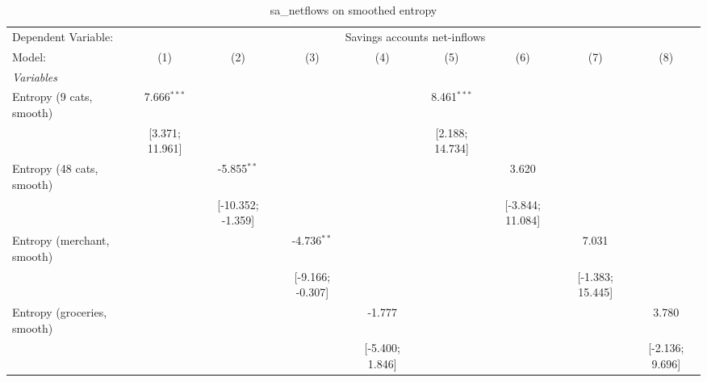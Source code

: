 
\begin{table}[htbp]
   \centering
   \tiny
   \begin{threeparttable}[b]
      \caption{\label{tab:reg_sa_netflows_s} sa\_netflows on smoothed entropy}
      \begin{tabular}{lcccccccc}
         \tabularnewline \midrule \midrule
         Dependent Variable: & \multicolumn{8}{c}{Savings accounts net-inflows}\\
         Model:                      & (1)                & (2)                & (3)                & (4)                & (5)                & (6)                & (7)                & (8)\\  
         \midrule
         \emph{Variables}\\
         Entropy (9 cats, smooth)    & 7.666$^{***}$      &                    &                    &                    & 8.461$^{***}$      &                    &                    &   \\   
                                     & [3.371; 11.961]    &                    &                    &                    & [2.188; 14.734]    &                    &                    &   \\   
         Entropy (48 cats, smooth)   &                    & -5.855$^{**}$      &                    &                    &                    & 3.620              &                    &   \\   
                                     &                    & [-10.352; -1.359]  &                    &                    &                    & [-3.844; 11.084]   &                    &   \\   
         Entropy (merchant, smooth)  &                    &                    & -4.736$^{**}$      &                    &                    &                    & 7.031              &   \\   
                                     &                    &                    & [-9.166; -0.307]   &                    &                    &                    & [-1.383; 15.445]   &   \\   
         Entropy (groceries, smooth) &                    &                    &                    & -1.777             &                    &                    &                    & 3.780\\   
                                     &                    &                    &                    & [-5.400; 1.846]    &                    &                    &                    & [-2.136; 9.696]\\   

\end{tabular}
\end{threeparttable}
\end{table}
